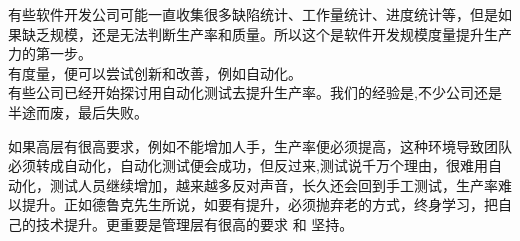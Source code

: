 有些软件开发公司可能一直收集很多缺陷统计、工作量统计、进度统计等，但是如果缺乏规模，还是无法判断生产率和质量。所以这个是软件开发规模度量提升生产力的第一步。\\
有度量，便可以尝试创新和改善，例如自动化。\\
有些公司已经开始探讨用自动化测试去提升生产率。我们的经验是,不少公司还是半途而废，最后失败。

如果高层有很高要求，例如不能增加人手，生产率便必须提高，这种环境导致团队必须转成自动化，自动化测试便会成功，但反过来,测试说千万个理由，很难用自动化，测试人员继续增加，越来越多反对声音，长久还会回到手工测试，生产率难以提升。正如德鲁克先生所说，如要有提升，必须抛弃老的方式，终身学习，把自己的技术提升。更重要是管理层有很高的要求
和 坚持。

\cite{drucker2References1}
\cite{drucker2References2}



